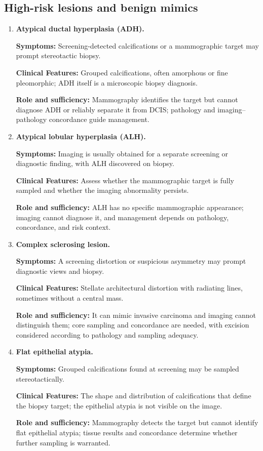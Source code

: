 \subsection{High-risk lesions and benign mimics}
\begin{enumerate}[leftmargin=*,itemsep=0.45em,topsep=0.4em]
\item \textbf{Atypical ductal hyperplasia (ADH).}\par\noindent\textbf{Symptoms:} Screening-detected calcifications or a mammographic target may prompt stereotactic biopsy.\par\noindent\textbf{Clinical Features:} Grouped calcifications, often amorphous or fine pleomorphic; ADH itself is a microscopic biopsy diagnosis.\par\noindent\textbf{Role and sufficiency:} Mammography identifies the target but cannot diagnose ADH or reliably separate it from DCIS; pathology and imaging--pathology concordance guide management.
\item \textbf{Atypical lobular hyperplasia (ALH).}\par\noindent\textbf{Symptoms:} Imaging is usually obtained for a separate screening or diagnostic finding, with ALH discovered on biopsy.\par\noindent\textbf{Clinical Features:} Assess whether the mammographic target is fully sampled and whether the imaging abnormality persists.\par\noindent\textbf{Role and sufficiency:} ALH has no specific mammographic appearance; imaging cannot diagnose it, and management depends on pathology, concordance, and risk context.
\item \textbf{Complex sclerosing lesion.}\par\noindent\textbf{Symptoms:} A screening distortion or suspicious asymmetry may prompt diagnostic views and biopsy.\par\noindent\textbf{Clinical Features:} Stellate architectural distortion with radiating lines, sometimes without a central mass.\par\noindent\textbf{Role and sufficiency:} It can mimic invasive carcinoma and imaging cannot distinguish them; core sampling and concordance are needed, with excision considered according to pathology and sampling adequacy.
\item \textbf{Flat epithelial atypia.}\par\noindent\textbf{Symptoms:} Grouped calcifications found at screening may be sampled stereotactically.\par\noindent\textbf{Clinical Features:} The shape and distribution of calcifications that define the biopsy target; the epithelial atypia is not visible on the image.\par\noindent\textbf{Role and sufficiency:} Mammography detects the target but cannot identify flat epithelial atypia; tissue results and concordance determine whether further sampling is warranted.

\end{enumerate}
